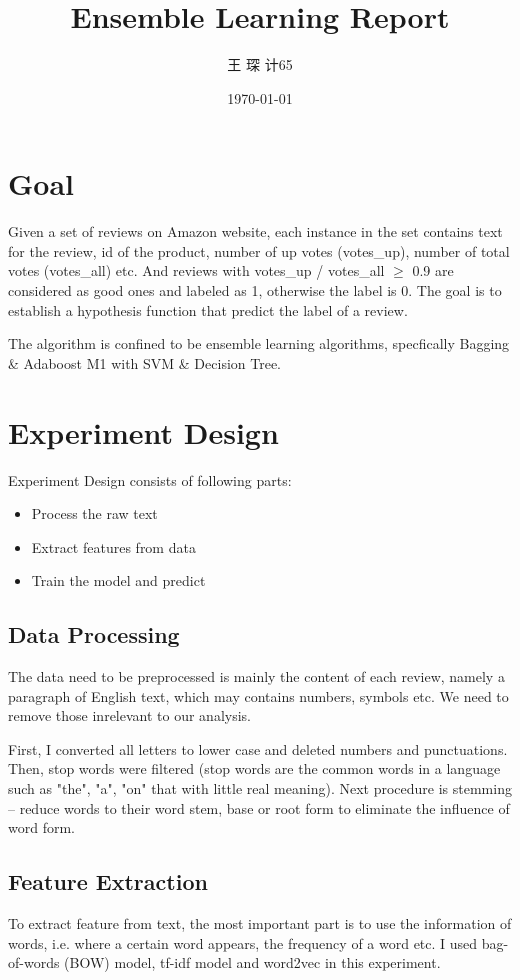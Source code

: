 \documentclass[paper=a4, fontsize=11pt, UTF8]{article} %
\title{\fontsize{18}\baselineskip Ensemble Learning Report}
\author{王 \; 琛 \quad 2016011360 \quad 计65}
\date{\normalsize\today} %
\begin{document}
\maketitle %

\fontsize{11pt}{18pt}\selectfont

\section{Goal}
Given a set of reviews on Amazon website, each instance in the set contains text for the review, id of the product, number of up votes (votes\_up), number of total votes (votes\_all) etc. And reviews with votes\_up / votes\_all $\ge$ 0.9 are considered as good ones and labeled as 1, otherwise the label is 0. The goal is to establish a hypothesis function that predict the label of a review.

The algorithm is confined to be ensemble learning algorithms, specfically Bagging \& Adaboost M1 with SVM \& Decision Tree.


\section{Experiment Design}
Experiment Design consists of following parts:
\begin{itemize}
    \item Process the raw text
    \item Extract features from data
    \item Train the model and predict
\end{itemize}

\subsection{Data Processing}
The data need to be preprocessed is mainly the content of each review, namely a paragraph of English text, which may contains numbers, symbols etc. We need to remove those inrelevant to our analysis. 

First, I converted all letters to lower case and deleted numbers and punctuations. Then, stop words were filtered (stop words are the common words in a language such as "the", "a", "on" that with little real meaning). Next procedure is stemming -- reduce words to their word stem, base or root form to eliminate the influence of word form.

\subsection{Feature Extraction}
To extract feature from text, the most important part is to use the information of words, i.e. where a certain word appears, the frequency of a word etc. I used bag-of-words (BOW) model, tf-idf model and word2vec in this experiment.
\end{document}
